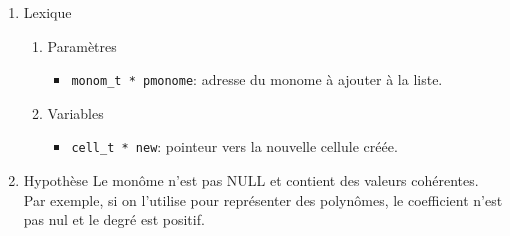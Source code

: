 \documentclass[11pt]{article}
\begin{document}
\begin{enumerate}
\item Lexique
\label{sec:org6f75b4c}
\begin{enumerate}
\item Paramètres
\label{sec:orge1193e6}
\begin{itemize}
\item \texttt{monom\_t * pmonome}: adresse du monome à ajouter à la liste.
\end{itemize}
\item Variables
\label{sec:org069a3c7}
\begin{itemize}
\item \texttt{cell\_t * new}: pointeur vers la nouvelle cellule créée.
\end{itemize}
\end{enumerate}
\item Hypothèse
\label{sec:orge18f7ea}
Le monôme n'est pas NULL et contient des valeurs cohérentes. Par exemple, si on l'utilise pour
représenter des polynômes, le coefficient n'est pas nul et le degré est positif.
\end{enumerate}
\end{document}
